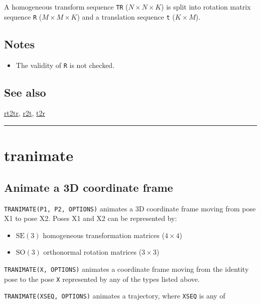 A homogeneous transform sequence \texttt{TR} ($N \times N \times K$) is split into rotation matrix
sequence \texttt{R} ($M \times M \times K$) and a translation sequence \texttt{t} ($K \times M$).


\subsection*{Notes}
\begin{itemize}
  \item The validity of \texttt{R} is not checked.
\end{itemize}

\subsection*{See also}


\hyperlink{rt2tr}{\color{blue} rt2tr}, \hyperlink{r2t}{\color{blue} r2t}, \hyperlink{t2r}{\color{blue} t2r}

\vspace{1.5ex}\rule{\textwidth}{1mm}

\hypertarget{tranimate}{\section*{tranimate}}
\subsection*{Animate a 3D coordinate frame}


\texttt{TRANIMATE(P1, P2, OPTIONS)} animates a 3D coordinate frame moving from pose X1
to pose X2.  Poses X1 and X2 can be represented by:

\begin{itemize}
  \item $\mbox{SE}(3)$ homogeneous transformation matrices ($4 \times 4$)
  \item $\mbox{SO}(3)$ orthonormal rotation matrices ($3 \times 3$)
\end{itemize}


\texttt{TRANIMATE(X, OPTIONS)} animates a coordinate frame moving from the identity pose
to the pose \texttt{X} represented by any of the types listed above.



\texttt{TRANIMATE(XSEQ, OPTIONS)} animates a trajectory, where \texttt{XSEQ} is any of

